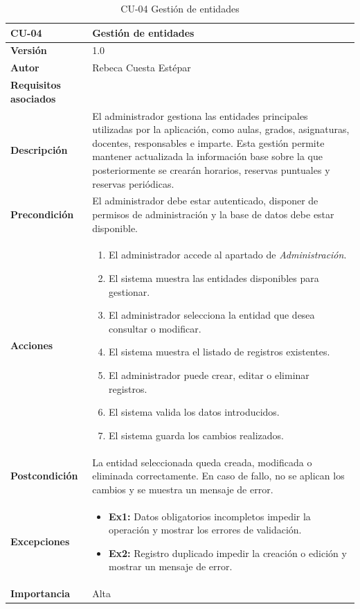 \begin{table}[p]
	\centering
	\begin{tabularx}{\linewidth}{ p{} p{} }
		\toprule
		\textbf{CU-04} & \textbf{Gestión de entidades}\\
		\toprule
		\textbf{Versión} & 1.0 \\
		\textbf{Autor} & Rebeca Cuesta Estépar \\
		\textbf{Requisitos asociados} &  \\
		\textbf{Descripción} & El administrador gestiona las entidades principales utilizadas por la aplicación, como aulas, grados, asignaturas, docentes, responsables e imparte. Esta gestión permite mantener actualizada la información base sobre la que posteriormente se crearán horarios, reservas puntuales y reservas periódicas. \\
		\textbf{Precondición} & El administrador debe estar autenticado, disponer de permisos de administración y la base de datos debe estar disponible. \\
		\textbf{Acciones} &
		\begin{enumerate}
			\def\labelenumi{\arabic{enumi}.}
			\tightlist
			\item El administrador accede al apartado de \emph{Administración}.
			\item El sistema muestra las entidades disponibles para gestionar.
			\item El administrador selecciona la entidad que desea consultar o modificar.
			\item El sistema muestra el listado de registros existentes.
			\item El administrador puede crear, editar o eliminar registros.
			\item El sistema valida los datos introducidos.
			\item El sistema guarda los cambios realizados.
		\end{enumerate}\\
		\textbf{Postcondición} & La entidad seleccionada queda creada, modificada o eliminada correctamente. En caso de fallo, no se aplican los cambios y se muestra un mensaje de error. \\
		\textbf{Excepciones} &
		\begin{itemize}
			\tightlist
			\item \textbf{Ex1:} Datos obligatorios incompletos \textrightarrow{} impedir la operación y mostrar los errores de validación.
			\item \textbf{Ex2:} Registro duplicado \textrightarrow{} impedir la creación o edición y mostrar un mensaje de error.
		\end{itemize}\\
		\textbf{Importancia} & Alta \\
		\bottomrule
	\end{tabularx}
	\caption{CU-04 Gestión de entidades}
\end{table}

